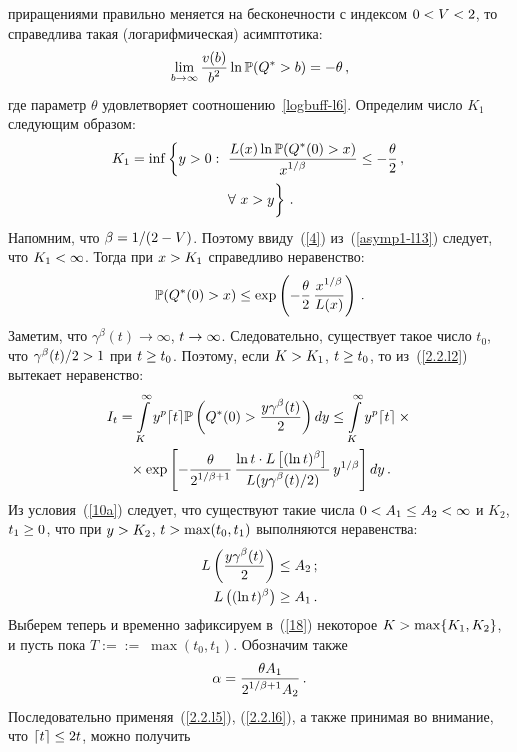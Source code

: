 \begin{multicols}{2}
приращениями  правильно меняется на бесконечности  с индексом
$0\hm<V\hm<2$, то справедлива такая (логарифмическая) асимптотика:
\begin{equation}
\lim\limits_{b \to \infty} \displaystyle\frac{\displaystyle v(b)\mathstrut}{\displaystyle b^2\mathstrut} \ln \mathbb{P}(Q^*>b)=-\theta\,,
\label{asymp1-l13}
\end{equation}
где параметр $\theta$ удовлетворяет соотношению~\eqref{logbuff-l6}.
Определим  число $K_1$ следующим образом:
\begin{multline*}
K_1=\inf\left\{ y>0:\,\,\fr{L(x)\ln\Pu(Q^*(0)>x)}{x^{1/\beta}}\leq -
\fr{\theta}{2}\,,\right.\\ 
\left.\forall\ x>y\vphantom{\fr{L(x)Q^*}{x^{1/\beta}}}\right\}\,.
\end{multline*}
Напомним, что $\beta\hm={1}/({2-V})$. Поэтому ввиду~(\ref{4}) 
из~(\ref{asymp1-l13}) следует, что $K_1\hm<\infty$. Тогда при $x\hm>K_1$
справедливо неравенство:
\begin{equation}
\label{2.2.l2}
\mathbb{P}(Q^*(0)>x) \leq \exp\left( -\displaystyle\frac{\displaystyle \theta\mathstrut}{\displaystyle 2\mathstrut}\, \displaystyle\frac{\displaystyle x^{1/\beta}\mathstrut}{\displaystyle L(x)\mathstrut} \right)\,.
\end{equation}
Заметим, что $\gamma^\beta(t) \to \infty$, $t \hm\to \infty$.
Следовательно, существует такое число $t_0$, что
$\gamma^\beta(t)/2\hm>1$ при $t \hm\geq t_0$. Поэтому, если $K\hm>K_1$, $t
\hm\geq t_0$, то из~(\ref{2.2.l2}) вытекает неравенство:
\begin{multline}
I_t = \int\limits_{K}^\infty y^p \lceil t\rceil\mathbb{P}\left(Q^*(0)>\displaystyle\frac{\displaystyle y 
\gamma^\beta(t)\mathstrut}{\displaystyle 2\mathstrut}\right)dy \leq \int\limits_{K}^\infty y^p \lceil t\rceil\times{}\\
{}\times \exp\left[
-\displaystyle\frac{\displaystyle \theta\mathstrut}{\displaystyle 2^{1/\beta+1}\mathstrut} \, \displaystyle\frac{\displaystyle \ln t \cdot L\left[ (\ln
t)^\beta\right]\mathstrut}{\displaystyle L(y\gamma^\beta(t)/2)\mathstrut}\, y^{1/\beta}
\right]dy\,.\label{18}
\end{multline}
Из условия~(\ref{10a}) следует, что существуют такие числа $0\hm<A_1\hm\le
A_2\hm<\infty $ и $K_2$, $t_1\hm\ge 0$, что при $y\hm>K_2$, $t\hm>\max(t_0,t_1)$
выполняются неравенства:
\begin{align}
\label{2.2.l5} 
L\left(\displaystyle\frac{\displaystyle y\gamma^\beta(t)\mathstrut}{\displaystyle 2\mathstrut}\right) &\le A_2\,;
\\
\label{2.2.l6} L\left( (\ln t)^\beta \right)&\ge A_1\,.
\end{align}
Выберем теперь и временно зафиксируем в~(\ref{18})  некоторое
$K\hm>\max\{K_1,K_2\}$, и пусть  пока $T:=$\linebreak $:=\;\max(t_0,t_1)$. Обозначим также 
$$
\alpha=\displaystyle\frac{\displaystyle \theta A_1\mathstrut}{\displaystyle 2^{1/\beta+1}A_2\mathstrut}\,.
$$
Последовательно применяя~(\ref{2.2.l5}), (\ref{2.2.l6}), а также
принимая во внимание, что $\lceil t\rceil \hm\leq 2t$, можно получить

\end{multicols}
